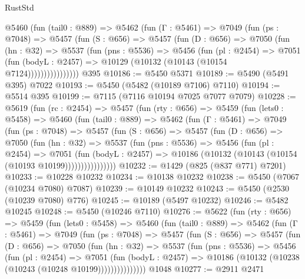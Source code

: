 \begin{lexlean}{RustStd}
\begin{coremodule}
          @5460
            (fun (tail0 : @889) =>
            @5462
              (fun (Γ : @5461) =>
              @7049
                (fun (ps : @7048) =>
                @5457
                  (fun (S : @656) =>
                  @5457
                    (fun (D : @656) =>
                    @7050
                      (fun (hn : @32) =>
                      @5537
                        (fun (pns : @5536) =>
                        @5456
                          (fun (pl : @2454) =>
                          @7051
                            (fun (bodyL : @2457) =>
                            @10129 (@10132 (@10143 (@10154 @7124))))))))))))))))
    @395
@10186 := @5450 @5371
@10189 := @5490 (@5491 @395) @7022
@10193 := @5450 (@5482 (@10189 @7106) @7110)
@10194 := @5514 @395
@10199 := @7115 (@7116 @10194 @7025 @7077 @7079)
@10228 := @5619
    (fun (rc : @2454) =>
    @5457
      (fun (rty : @656) =>
      @5459
        (fun (lets0 : @5458) =>
        @5460
          (fun (tail0 : @889) =>
          @5462
            (fun (Γ : @5461) =>
            @7049
              (fun (ps : @7048) =>
              @5457
                (fun (S : @656) =>
                @5457
                  (fun (D : @656) =>
                  @7050
                    (fun (hn : @32) =>
                    @5537
                      (fun (pns : @5536) =>
                      @5456
                        (fun (pl : @2454) =>
                        @7051
                          (fun (bodyL : @2457) =>
                          @10186 (@10132 (@10143 (@10154 (@10193 @10199))))))))))))))))
@10232 := @1429 (@825 (@837 @771) @7201)
@10233 := @10228 @10232
@10234 := @10138 @10232
@10238 := @5450 (@7067 (@10234 @7080) @7087)
@10239 := @10149 @10232
@10243 := @5450 (@2530 (@10239 @7080) @776)
@10245 := @10189 (@5497 @10232)
@10246 := @5482 @10245
@10248 := @5450 (@10246 @7110)
@10276 := @5622
    (fun (rty : @656) =>
    @5459
      (fun (lets0 : @5458) =>
      @5460
        (fun (tail0 : @889) =>
        @5462
          (fun (Γ : @5461) =>
          @7049
            (fun (ps : @7048) =>
            @5457
              (fun (S : @656) =>
              @5457
                (fun (D : @656) =>
                @7050
                  (fun (hn : @32) =>
                  @5537
                    (fun (pns : @5536) =>
                    @5456
                      (fun (pl : @2454) =>
                      @7051
                        (fun (bodyL : @2457) =>
                        @10186 (@10132 (@10238 (@10243 (@10248 @10199)))))))))))))))
    @1048
@10277 := @2911 @2471

\end{coremodule}
\end{lexlean}
